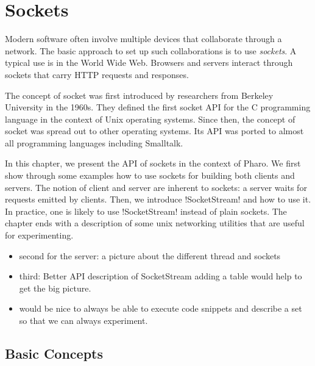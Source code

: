 \documentclass[a4paper,10pt,twoside]{book}
\begin{document}
	\sloppy
\fi
\newcommand{\noury}[1]{\nnbb{Noury}{#1}}


\chapter{Sockets}\label{cha:sockets}
\chapterauthor{\authornoury{}}

Modern software often involve multiple devices that collaborate through a network.
The basic approach to set up such collaborations is to use \textit{sockets}. A typical use is in the World Wide Web. Browsers and servers interact through sockets that carry HTTP requests and responses.

The concept of socket was first introduced by researchers from Berkeley University in the 1960s. They defined the first socket API for the C programming language in the context of Unix operating systems. Since then, the concept of socket was spread out to other operating systems. 
Its API was ported to almost all programming languages including Smalltalk.

In this chapter, we present the API of sockets in the context of Pharo.
We first show through some examples how to use sockets for building both clients and servers. The notion of client and server are inherent to sockets: a server waits for requests emitted by clients.
Then, we introduce \ct!SocketStream! and how to use it.
In practice, one is likely to use \ct!SocketStream! instead of plain sockets.
The chapter ends with a description of some unix networking utilities that are useful for experimenting.

\begin{itemize}
\item second 
	for the server: a picture about the different thread and sockets

\item third: Better API description of SocketStream
	adding a table would help to get the big picture.
	
\item would be nice to always be able to execute code snippets and describe a set so that we can always experiment.
\end{itemize}


\section{Basic Concepts}
\end{document}
